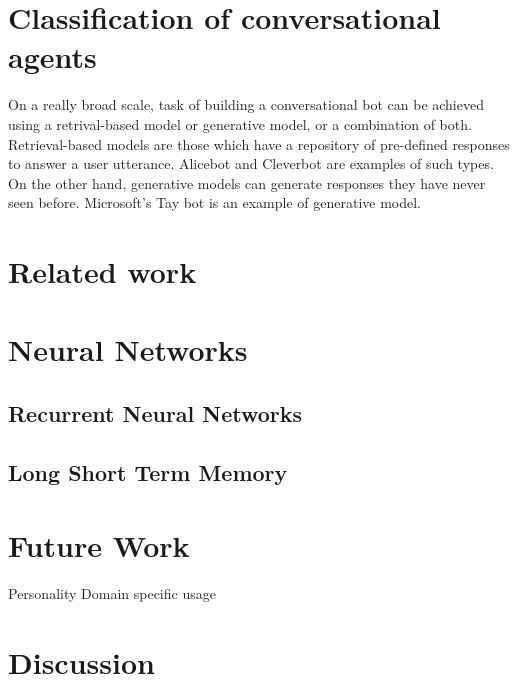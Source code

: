 \documentclass[letterpaper] {article} %
\begin{document}
\section{Classification of conversational agents}
On a really broad scale, task of building a conversational bot can be achieved using a retrival-based model or generative model, or a combination of both. Retrieval-based models are those which have a repository of pre-defined responses to answer a user utterance. Alicebot and Cleverbot are examples of such types. On the other hand, generative models can generate responses they have never seen before. Microsoft's Tay bot is an example of generative model. 


\section{Related work}


\section{Neural Networks}

\subsection{Recurrent Neural Networks} 

\subsection{Long Short Term Memory}

\section{Future Work}
Personality
Domain specific usage

\section{Discussion}




\end{document}
